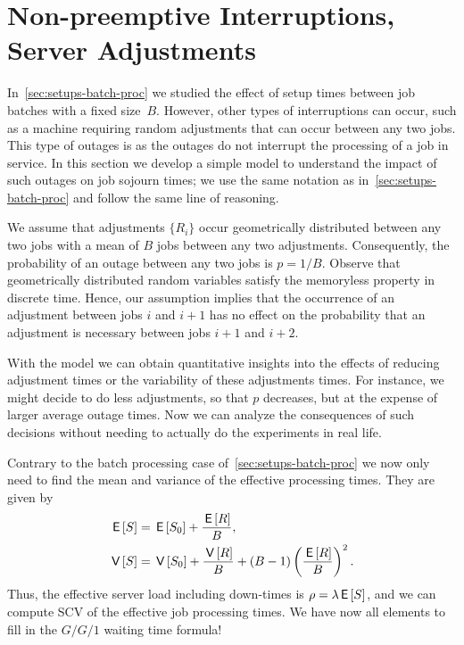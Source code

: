 \section{Non-preemptive Interruptions, Server Adjustments}
\label{sec:non-preempt-interr}





In~\cref{sec:setups-batch-proc} we studied the effect of setup times between job batches with a fixed size~$B$.
However, other types of interruptions can occur, such as a machine requiring random adjustments that can occur between any two jobs.
This type of outages is  as the outages do not interrupt the processing of a job in service.
In this section we develop a simple model to understand the impact of such outages on job sojourn times; we use the same notation as in~\cref{sec:setups-batch-proc} and follow the same line of reasoning.

We assume that adjustments $\{R_i\}$ occur geometrically distributed between any two jobs with a mean of $B$ jobs between any two adjustments.
Consequently, the probability of an outage between any two jobs is $p=1/B$.
Observe that geometrically distributed random variables satisfy the memoryless property in discrete time.
Hence, our assumption implies that the occurrence of an adjustment between jobs $i$ and $i+1$ has no effect on the probability that an adjustment is necessary between jobs $i+1$ and $i+2$.

With the model we can obtain quantitative insights into the effects of reducing adjustment times or the variability of these adjustments times.
For instance, we might decide to do less adjustments, so that $p$ decreases, but at the expense of larger average outage times.
Now we can analyze the consequences of such decisions without needing to actually do the experiments in real life. 

Contrary to the batch processing case of~\cref{sec:setups-batch-proc} we now only need to find the mean and variance of the effective processing times. They are given by
\begin{align}
  \,\mathsf{E}\left[S\right] &= \,\mathsf{E}\left[S_0\right] + \frac{\,\mathsf{E}\left[R\right]}B, \label{eq:88}\\
  \,\mathsf{V}\left[S\right] &= \,\mathsf{V}\left[S_0\right] + \frac{\,\mathsf{V}\left[R\right]} B + (B-1)\left(\frac{\,\mathsf{E}\left[R\right]}{B}\right)^2.\label{eq:89} 
\end{align}
Thus, the effective server load including down-times is $\rho = \lambda \,\mathsf{E}\left[S\right]$, and we can compute SCV of the effective job processing times.
We have now all elements to fill in the $G/G/1$ waiting time formula!




